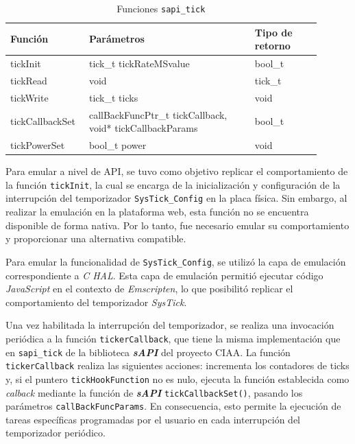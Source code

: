\begin{table}[h]
	\centering
	\caption[Funciones \texttt{sapi\_tick}]{Funciones \texttt{sapi\_tick}}
	\begin{tabular}{p{0.20\linewidth} p{0.50\linewidth}  p{0.20\linewidth}}    
		\toprule
		\textbf{Función} 	 & \textbf{Parámetros} 		& \textbf{Tipo de retorno}  \\
		\midrule
		tickInit & tick\_t tickRateMSvalue 		&  bool\_t \\		
		tickRead	 & void				&  tick\_t \\
		tickWrite	 & tick\_t ticks 				& void \\
		tickCallbackSet	 & callBackFuncPtr\_t tickCallback, void* tickCallbackParams				&  bool\_t \\
		tickPowerSet & bool\_t power 		&  void \\	
		\bottomrule
		\hline
	\end{tabular}
	\label{tab:sapiTick}
\end{table}

Para emular a nivel de API, se tuvo como objetivo replicar el comportamiento de la función \texttt{tickInit}, la cual se encarga de la inicialización y configuración de la interrupción del temporizador \texttt{SysTick\_Config} en la placa física. Sin embargo, al realizar la emulación en la plataforma web, esta función no se encuentra disponible de forma nativa. Por lo tanto, fue necesario emular su comportamiento y proporcionar una alternativa compatible.

Para emular la funcionalidad de \texttt{SysTick\_Config}, se utilizó la capa de emulación correspondiente a \textit{C HAL}. Esta capa de emulación permitió ejecutar código \textit{JavaScript} en el contexto de \textit{Emscripten}, lo que posibilitó replicar el comportamiento del temporizador \textit{SysTick}. 

Una vez habilitada la interrupción del temporizador, se realiza una invocación periódica a la función \texttt{tickerCallback}, que tiene la misma implementación que en \texttt{sapi\_tick} de la biblioteca \textit{\textbf{sAPI}} del proyecto CIAA. La función \newline \texttt{tickerCallback} realiza las siguientes acciones: incrementa los contadores de ticks y, si el puntero \texttt{tickHookFunction} no es nulo, ejecuta la función establecida como \textit{calback} mediante la función de \textit{\textbf{sAPI}} \texttt{tickCallbackSet()}, pasando los parámetros \texttt{callBackFuncParams}. En consecuencia, esto permite la ejecución de tareas específicas programadas por el usuario en cada interrupción del temporizador periódico.

